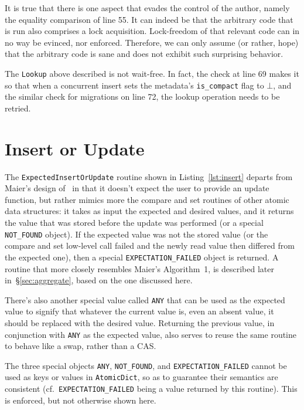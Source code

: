 It is true that there is one aspect that evades the control of the author, namely the equality comparison of line 55.
It can indeed be that the arbitrary code that is run also comprises a lock acquisition.
Lock-freedom of that relevant code can in no way be evinced, nor enforced.
Therefore, we can only assume (or rather, hope) that the arbitrary code is sane and does not exhibit such surprising behavior.

The \texttt{Lookup} above described is not wait-free.
In fact, the check at line 69 makes it so that when a concurrent insert sets the metadata's \texttt{{is\_compact}} flag to $\bot$, and the similar check for migrations on line 72, the lookup operation needs to be retried.


\section{Insert or Update}\label{sec:insert-or-update}

The \texttt{ExpectedInsertOrUpdate} routine shown in Listing~\ref{lst:insert} departs from Maier's design of~\cite[Algorithm~1]{maier} in that it doesn't expect the user to provide an update function, but rather mimics more the compare and set routines of other atomic data structures: it takes as input the expected and desired values, and it returns the value that was stored before the update was performed (or a special \texttt{{NOT\_FOUND}} object).
If the expected value was not the stored value (or the compare and set low-level call failed and the newly read value then differed from the expected one), then a special \texttt{{EXPECTATION\_FAILED}} object is returned.
A routine that more closely resembles Maier's Algorithm~1, is described later in~\S\ref{sec:aggregate}, based on the one discussed here.

There's also another special value called \texttt{ANY} that can be used as the expected value to signify that whatever the current value is, even an absent value, it should be replaced with the desired value.
Returning the previous value, in conjunction with \texttt{ANY} as the expected value, also serves to reuse the same routine to behave like a swap, rather than a CAS\@.

The three special objects \texttt{{ANY}}, \texttt{{NOT\_FOUND}}, and \texttt{{EXPECTATION\_FAILED}} cannot be used as keys or values in \texttt{AtomicDict}, so as to guarantee their semantics are consistent (cf.\texttt{\ {EXPECTATION\_FAILED}} being a value returned by this routine).
This is enforced, but not otherwise shown here.


